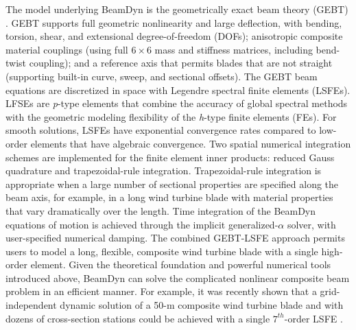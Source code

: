 The model underlying BeamDyn is the geometrically exact beam theory (GEBT) \cite{HodgesBeamBook}.   
GEBT supports full geometric nonlinearity and large deflection, with bending, torsion, shear, and extensional degree-of-freedom (DOFs); anisotropic composite material couplings (using full $6 \times 6$ mass and stiffness matrices, including bend-twist coupling); and a reference axis that permits blades that are not straight (supporting built-in curve, sweep, and sectional offsets). 
The GEBT beam equations are discretized in space with Legendre spectral finite elements (LSFEs).  
LFSEs are {\it p}-type elements that combine the accuracy of global spectral methods with the geometric modeling flexibility of the {\it h}-type finite elements (FEs). \cite{Patera:1984} 
For smooth solutions, LSFEs have exponential convergence rates compared to low-order elements that have algebraic convergence. \cite{Sprague:2003,Wang:SFE2013} 
Two spatial numerical integration schemes are implemented for the finite element inner products: reduced Gauss quadrature and trapezoidal-rule integration.  
Trapezoidal-rule integration is appropriate when a large number of sectional properties are specified along the beam axis, for example, in a long wind turbine blade with material properties that vary dramatically over the length.  
Time integration of the BeamDyn equations of motion is achieved through the implicit generalized-$\alpha$ solver, with user-specified numerical damping.
The combined GEBT-LSFE  approach permits users to model a long, flexible, composite wind turbine blade with a single high-order element.  
Given the theoretical foundation and powerful numerical tools introduced above, BeamDyn can solve the complicated nonlinear composite beam problem in an efficient manner. For example, it was recently shown that a grid-independent dynamic solution of a 50-m composite wind turbine blade and with dozens of cross-section stations could be achieved with a 
single $7^{th}$-order LSFE \cite{Wang:2016}.

